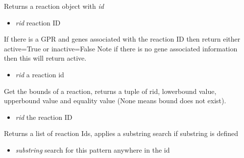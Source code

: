 \documentclass[a4paper,11pt,english]{sphinxmanual}
\begin{document}
\begin{fulllineitems}
\begin{fulllineitems}
\end{fulllineitems}


\begin{fulllineitems}
\label{modules_doc:cbmpy.CBModel.Model.getReaction}
Returns a reaction object with \emph{id}
\begin{itemize}
\item {} 
\emph{rid} reaction ID

\end{itemize}

\end{fulllineitems}


\begin{fulllineitems}
\label{modules_doc:cbmpy.CBModel.Model.getReactionActivity}
If there is a GPR and genes associated with the reaction ID then return either active=True or inactive=False
Note if there is no gene associated information then this will return active.
\begin{itemize}
\item {} 
\emph{rid} a reaction id

\end{itemize}

\end{fulllineitems}


\begin{fulllineitems}
\label{modules_doc:cbmpy.CBModel.Model.getReactionBounds}
Get the bounds of a reaction, returns a tuple of rid, lowerbound value, upperbound value and equality value (None means bound does not exist).
\begin{itemize}
\item {} 
\emph{rid} the reaction ID

\end{itemize}

\end{fulllineitems}


\begin{fulllineitems}
\label{modules_doc:cbmpy.CBModel.Model.getReactionIds}
Returns a list of reaction Ids, applies a substring search if substring is defined
\begin{itemize}
\item {} 
\emph{substring} search for this pattern anywhere in the id


\end{itemize}
\end{fulllineitems}
\end{fulllineitems}
\end{document}

